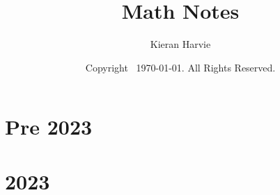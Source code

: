 \documentclass[12pt]{report}
\title{Math Notes}
\date{Copyright \textcopyright\, \today. All Rights Reserved.}
\author{Kieran Harvie}
\begin{document}
\maketitle
\tableofcontents

\chapter{Pre 2023}














\chapter{2023}
































\end{document}
